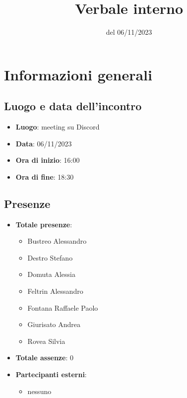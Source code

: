 \documentclass[12pt]{article}
\title{Verbale interno}
\date{del 06/11/2023}
\begin{document}
	\makefirstpage
	
	
	\clearpage
	
	\tableofcontents
	\clearpage

    \section{Informazioni generali}
	
	\subsection{Luogo e data dell'incontro}
	
    	\begin{itemize}
    		\item \textbf{Luogo}: meeting su Discord
    		\item \textbf{Data}: 06/11/2023
    		\item \textbf{Ora di inizio}: 16:00
    		\item \textbf{Ora di fine}: 18:30
    	\end{itemize}
	
	\subsection{Presenze}
	
    	\begin{itemize}
    		\item \textbf{Totale presenze}:
    		\begin{itemize}
    			\item Bustreo Alessandro
    			\item Destro Stefano
    			\item Domuta Alessia 
    			\item Feltrin Alessandro 
    			\item Fontana Raffaele Paolo 
    			\item Giurisato Andrea 
    			\item Rovea Silvia
    		\end{itemize}
    		
    		\item \textbf{Totale assenze}: 0
    		
    		\item \textbf{Partecipanti esterni}:
    		\begin{itemize}
    			\item nessuno
    		\end{itemize}
    	\end{itemize}
\end{document}
